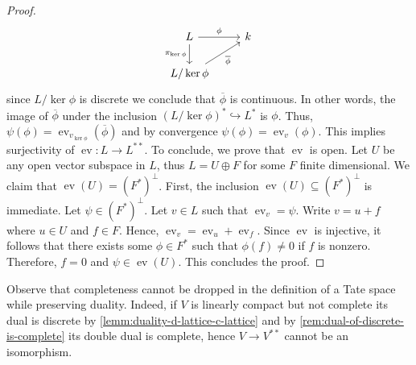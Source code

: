\begin{proof}
	\[
	\begin{tikzcd}
		L \arrow[r, "\phi"] \arrow[d, swap, "\pi_{\ker\phi}"] & k \\
		L/\ker\phi \arrow[ur, swap, "\overline{\phi}"] &
	\end{tikzcd}
	\]
	 since $L/\ker\phi$ is discrete we conclude that $\overline{\phi}$ is continuous. In other words, the image of $\overline{\phi}$ under the inclusion $(L/\ker\phi)^{*} \hookrightarrow L^{*}$ is $\phi$. Thus, $\psi(\phi) = \operatorname{ev}_{v_{\ker\phi}}(\overline{\phi})$ and by convergence $\psi(\phi) = \operatorname{ev}_{v}(\phi)$. This implies surjectivity of $\operatorname{ev}\colon L \to L^{**}$. To conclude, we prove that $\operatorname{ev}$ is open. Let $U$ be any open vector subspace in $L$, thus $L = U \oplus F$ for some $F$ finite dimensional. We claim that $\operatorname{ev}(U) = (F^{*})^{\perp}$. First, the inclusion $\operatorname{ev}(U) \subseteq (F^{*})^{\perp}$ is immediate. Let $\psi \in (F^{*})^{\perp}$. Let $v \in L$ such that $\operatorname{ev}_{v} = \psi$. Write $v = u + f$ where $u \in U$ and $f \in F$. Hence, $\operatorname{ev}_{v} = \operatorname{ev}_{u} + \operatorname{ev}_{f}$. Since $\operatorname{ev}$ is injective, it follows that there exists some $\phi\in F^{*}$ such that $\phi(f) \neq 0$ if $f$ is nonzero. Therefore, $f = 0$ and $\psi \in \operatorname{ev}(U)$. This concludes the proof.
\end{proof}
\begin{remark}\label{rem:completeness-is-necessary-for-sel-duality}
	Observe that completeness cannot be dropped in the definition of a Tate space while preserving duality. Indeed, if $V$ is linearly compact but not complete its dual is discrete by \cref{lemm:duality-d-lattice-c-lattice} and by \cref{rem:dual-of-discrete-is-complete} its double dual is complete, hence $V \to V^{**}$ cannot be an isomorphism.
\end{remark}

